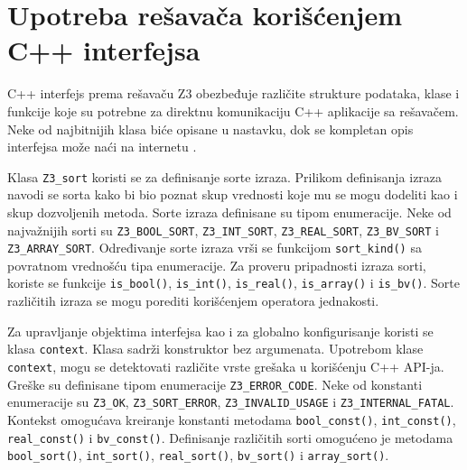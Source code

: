 \documentclass[12pt,oneside]{memoir}
\begin{document}
\section{Upotreba rešavača korišćenjem C++ interfejsa} \label{sec:num4}
C++ interfejs prema rešavaču Z3 obezbeđuje različite strukture podataka, klase i funkcije koje su potrebne za direktnu komunikaciju C++ aplikacije sa rešavačem. Neke od najbitnijih klasa biće opisane u nastavku, dok se kompletan opis interfejsa može naći na internetu \cite{cppapi}.

Klasa \texttt{Z3\_sort} koristi se za definisanje sorte izraza.  Prilikom definisanja izraza navodi se sorta kako bi bio poznat skup vrednosti koje mu se mogu dodeliti kao i skup dozvoljenih metoda. Sorte izraza definisane su tipom enumeracije. Neke od najvažnijih sorti su \texttt{Z3\_BOOL\_SORT}, \texttt{Z3\_INT\_SORT}, \texttt{Z3\_REAL\_SORT}, \texttt{Z3\_BV\_SORT} i \texttt{Z3\_ARRAY\_SORT}. Određivanje sorte izraza vrši se funkcijom \texttt{sort\_kind()} sa povratnom vrednošću tipa enumeracije. Za proveru pripadnosti izraza sorti, koriste se funkcije \texttt{is\_bool()}, \texttt{is\_int()}, \texttt{is\_real()}, \texttt{is\_array()} i \texttt{is\_bv()}. Sorte različitih izraza se mogu porediti korišćenjem operatora jednakosti. \par 

Za upravljanje objektima interfejsa kao i za globalno konfigurisanje koristi se klasa \texttt{context}. Klasa sadrži konstruktor bez argumenata. Upotrebom klase \texttt{context}, mogu se detektovati različite vrste grešaka u korišćenju C++ API-ja. Greške su definisane tipom enumeracije \texttt{Z3\_ERROR\_CODE}. Neke od konstanti enumeracije su \texttt{Z3\_OK}, \texttt{Z3\_SORT\_ERROR}, \texttt{Z3\_INVALID\_USAGE} i \texttt{Z3\_INTERNAL\_FATAL}.  Kontekst omogućava kreiranje konstanti metodama \texttt{bool\_const()}, \texttt{int\_const()}, \texttt{real\_const()} i \texttt{bv\_const()}. Definisanje različitih sorti omogućeno je metodama \texttt{bool\_sort()}, \texttt{int\_sort()}, \texttt{real\_sort()}, \texttt{bv\_sort()} i \texttt{array\_sort()}. 
\par
\end{document}
